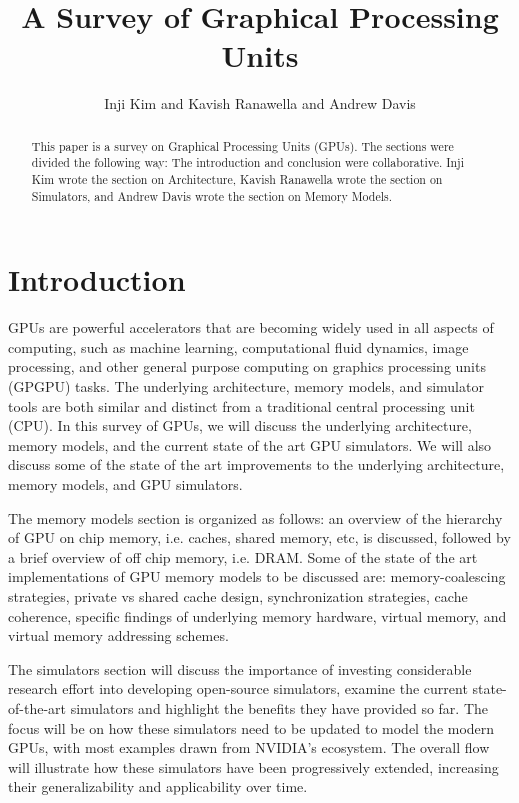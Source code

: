 \documentclass[conference]{IEEEtran}
\title{A Survey of Graphical Processing Units}
\author{\normalsize{Inji Kim and Kavish Ranawella and Andrew Davis}}
\begin{document}
\maketitle
\thispagestyle{plain}
\pagestyle{plain}




\begin{abstract}
  This paper is a survey on Graphical Processing Units (GPUs).
  The sections were divided the following way: The introduction and conclusion were collaborative.
  Inji Kim wrote the section on Architecture, Kavish Ranawella wrote the section on Simulators, and Andrew Davis wrote the section on Memory Models.
\end{abstract}

\section{Introduction}
GPUs are powerful accelerators that are becoming widely used in all aspects of computing, such as machine learning, computational fluid dynamics, image processing, and other general purpose computing on graphics processing units (GPGPU) tasks.
The underlying architecture, memory models, and simulator tools are both similar and distinct from a traditional central processing unit (CPU).
In this survey of GPUs, we will discuss the underlying architecture, memory models, and the current state of the art GPU simulators.
We will also discuss some of the state of the art improvements to the underlying architecture, memory models, and GPU simulators.

The memory models section is organized as follows: an overview of the hierarchy of GPU on chip memory, i.e. caches, shared memory, etc, is discussed, followed by a brief overview of off chip memory, i.e. DRAM.
Some of the state of the art implementations of GPU memory models to be discussed are: memory-coalescing strategies, private vs shared cache design, synchronization strategies, cache coherence, specific findings of underlying memory hardware, virtual memory, and virtual memory addressing schemes.

The simulators section will discuss the importance of investing considerable research effort into developing open-source simulators, examine the current state-of-the-art simulators and highlight the benefits they have provided so far.
The focus will be on how these simulators need to be updated to model the modern GPUs, with most examples drawn from NVIDIA's ecosystem.
The overall flow will illustrate how these simulators have been progressively extended, increasing their generalizability and applicability over time.
\end{document}
